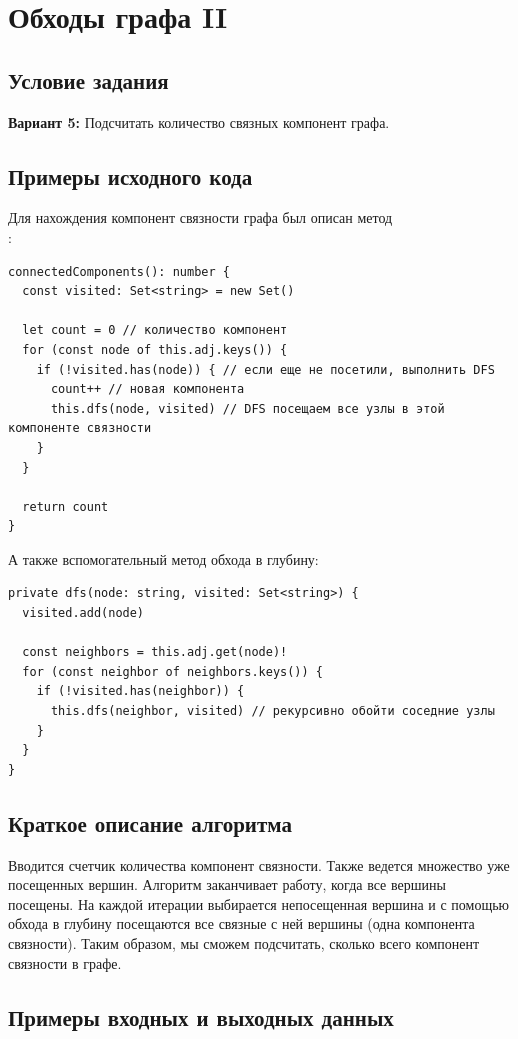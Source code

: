 \section{Обходы графа II}
\subsection{Условие задания}
\textbf{Вариант 5:} Подсчитать количество связных компонент графа.

\subsection{Примеры исходного кода}
Для нахождения компонент связности графа был описан метод\\
:
\begin{verbatim}
connectedComponents(): number {
  const visited: Set<string> = new Set()

  let count = 0 // количество компонент
  for (const node of this.adj.keys()) {
    if (!visited.has(node)) { // если еще не посетили, выполнить DFS
      count++ // новая компонента
      this.dfs(node, visited) // DFS посещаем все узлы в этой компоненте связности
    }
  }

  return count
}
\end{verbatim}

А также вспомогательный метод обхода в глубину:
\begin{verbatim}
private dfs(node: string, visited: Set<string>) {
  visited.add(node)

  const neighbors = this.adj.get(node)!
  for (const neighbor of neighbors.keys()) {
    if (!visited.has(neighbor)) {
      this.dfs(neighbor, visited) // рекурсивно обойти соседние узлы
    }
  }
}
\end{verbatim}

\subsection{Краткое описание алгоритма}
Вводится счетчик количества компонент связности. Также ведется множество
уже посещенных вершин. Алгоритм заканчивает работу, когда все вершины посещены.
На каждой итерации выбирается непосещенная вершина и с помощью обхода
в глубину посещаются все связные с ней вершины (одна компонента связности).
Таким образом, мы сможем подсчитать, сколько всего компонент связности
в графе.

\subsection{Примеры входных и выходных данных}
